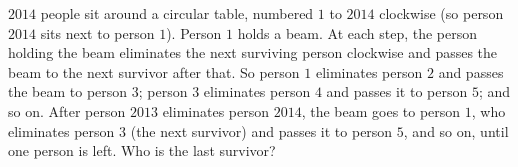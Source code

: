 $2014$ people sit around a circular table, numbered $1$ to $2014$ clockwise (so person $2014$ sits next to person $1$). Person $1$ holds a beam. At each step, the person holding the beam eliminates the next surviving person clockwise and passes the beam to the next survivor after that. So person $1$ eliminates person $2$ and passes the beam to person $3$; person $3$ eliminates person $4$ and passes it to person $5$; and so on. After person $2013$ eliminates person $2014$, the beam goes to person $1$, who eliminates person $3$ (the next survivor) and passes it to person $5$, and so on, until one person is left. Who is the last survivor?
